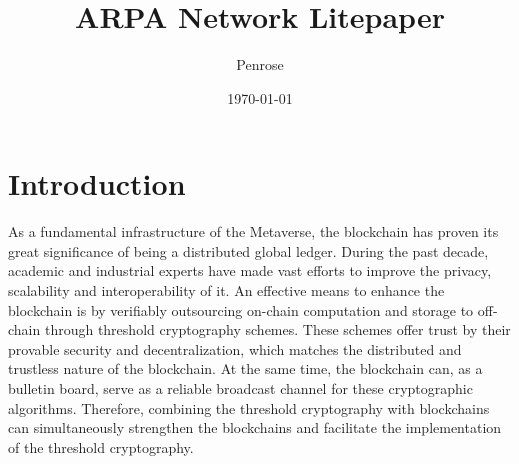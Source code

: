 \documentclass[11pt]{article}
\title{ARPA Network Litepaper}
\author{Penrose}
\date{\today}
\begin{document}
\maketitle

\section{Introduction}

As a fundamental infrastructure of the Metaverse, the blockchain has proven its great significance of being a distributed global ledger. During the past decade, academic and industrial experts have made vast efforts to improve the privacy, scalability and interoperability of it. An effective means to enhance the blockchain is by verifiably outsourcing on-chain computation and storage to off-chain through threshold cryptography schemes. These schemes offer trust by their provable security and decentralization, which matches the distributed and trustless nature of the blockchain. At the same time, the blockchain can, as a bulletin board, serve as a reliable broadcast channel for these cryptographic algorithms. Therefore, combining the threshold cryptography with blockchains can simultaneously strengthen the blockchains and facilitate the implementation of the threshold cryptography.
\end{document}
